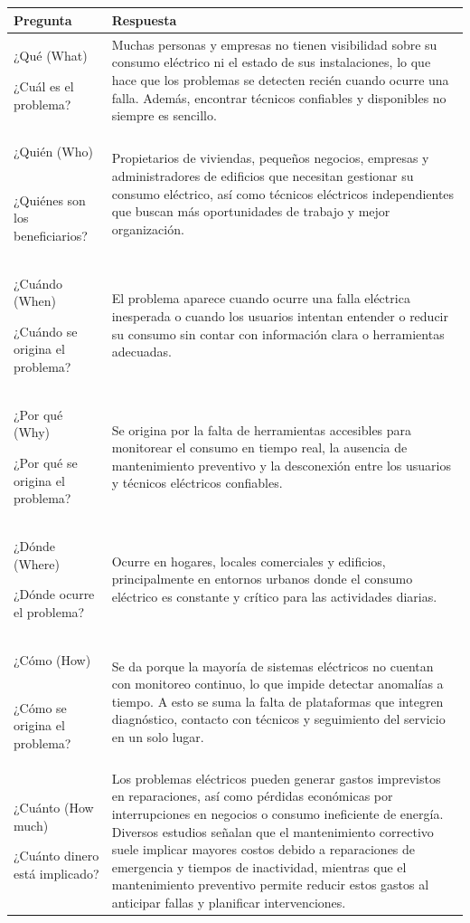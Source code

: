 \begin{longtable}{|p{6cm}|p{9cm}|}
\hline
\textbf{Pregunta} & \textbf{Respuesta} \\
\hline

¿Qué (What) 
\

¿Cuál es el problema?
& Muchas personas y empresas no tienen visibilidad sobre su consumo eléctrico ni el estado de sus instalaciones, lo que hace que los problemas se detecten recién cuando ocurre una falla. Además, encontrar técnicos confiables y disponibles no siempre es sencillo. \\
\hline

¿Quién (Who) 
\

¿Quiénes son los beneficiarios?
& Propietarios de viviendas, pequeños negocios, empresas y administradores de edificios que necesitan gestionar su consumo eléctrico, así como técnicos eléctricos independientes que buscan más oportunidades de trabajo y mejor organización. \\
\hline

¿Cuándo (When) 
\

¿Cuándo se origina el problema?
& El problema aparece cuando ocurre una falla eléctrica inesperada o cuando los usuarios intentan entender o reducir su consumo sin contar con información clara o herramientas adecuadas. \\
\hline

¿Por qué (Why)
\

¿Por qué se origina el problema?
& Se origina por la falta de herramientas accesibles para monitorear el consumo en tiempo real, la ausencia de mantenimiento preventivo y la desconexión entre los usuarios y técnicos eléctricos confiables. \\
\hline

¿Dónde (Where)
\

¿Dónde ocurre el problema?
& Ocurre en hogares, locales comerciales y edificios, principalmente en entornos urbanos donde el consumo eléctrico es constante y crítico para las actividades diarias. \\
\hline

¿Cómo (How)
\

¿Cómo se origina el problema?
& Se da porque la mayoría de sistemas eléctricos no cuentan con monitoreo continuo, lo que impide detectar anomalías a tiempo. A esto se suma la falta de plataformas que integren diagnóstico, contacto con técnicos y seguimiento del servicio en un solo lugar. \\
\hline

¿Cuánto (How much)
\

¿Cuánto dinero está implicado?
& Los problemas eléctricos pueden generar gastos imprevistos en reparaciones, así como pérdidas económicas por interrupciones en negocios o consumo ineficiente de energía. Diversos estudios señalan que el mantenimiento correctivo suele implicar mayores costos debido a reparaciones de emergencia y tiempos de inactividad, mientras que el mantenimiento preventivo permite reducir estos gastos al anticipar fallas y planificar intervenciones. \cite{maintenance_costs} \\
\hline

\end{longtable}

